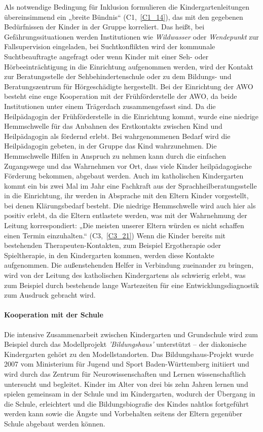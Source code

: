 Als notwendige Bedingung für Inklusion formulieren die Kindergartenleitungen übereinsimmend ein „breite Bündnis“ (C1,~\ref{C1_14}), das mit den gegebenen Bedürfnissen der Kinder in der Gruppe korreliert. Das heißt, bei Gefährungssituationen werden Institutionen wie \emph{Wildwasser} oder \emph{Wendepunkt} zur Fallsupervision eingeladen, bei Suchtkonflikten wird der kommunale Suchtbeauftragte angefragt oder wenn Kinder mit einer Seh- oder Hörbeeinträchtigung in die Einrichtung aufgenommen werden, wird der Kontakt zur Beratungsstelle der Sehbehindertenschule oder zu dem Bildungs- und Beratungszentrum für Hörgeschädigte hergestellt. Bei der Einrichtung der AWO besteht eine enge Kooperation mit der Frühförderstelle der AWO, da beide Institutionen unter einem Trägerdach zusammengefasst sind. Da die Heilpädagogin der Frühförderstelle in die Einrichtung kommt, wurde eine niedrige Hemmschwelle für das Anbahnen des Erstkontakts zwischen Kind und Heilpädagogin als fördernd erlebt. Bei wahrgenommenen Bedarf wird die Heilpädagogin gebeten, in der Gruppe das Kind wahrzunehmen. Die Hemmschwelle Hilfen in Anspruch zu nehmen kann durch die einfachen Zugangswege und das Wahrnehmen vor Ort, dass viele Kinder heilpädagogische Förderung bekommen, abgebaut werden.
Auch im katholischen Kindergarten kommt ein bis zwei Mal im Jahr eine Fachkraft aus der Sprachheilberatungsstelle in die Einrichtung, ihr werden in Absprache mit den Eltern Kinder vorgestellt, bei denen Klärungsbedarf besteht. Die niedrige Hemmschwelle wird auch hier als positiv erlebt, da die Eltern entlastete werden, was mit der Wahrnehmung der Leitung korrespondiert: „Die meisten unserer Eltern würden es nicht schaffen einen Termin einzuhalten.“ (C3,~\ref{C3_21}) 
Wenn die Kinder bereits mit bestehenden Therapeuten-Kontakten, zum Beispiel Ergotherapie oder Spieltherapie, in den Kindergarten kommen, werden diese Kontakte aufgenommen.     
Die außenstehenden Helfer in Verbindung zueinander zu bringen, wird von der Leitung des katholischen Kindergartens als schwierig erlebt, was zum Beispiel durch bestehende lange Wartezeiten für eine Entwicklungsdiagnostik zum Ausdruck gebracht wird. 
  
\paragraph{Kooperation mit der Schule}
Die intensive Zusammenarbeit zwischen Kindergarten und Grundschule wird zum Beispiel durch das Modellprojekt \emph{'Bildungshaus'} unterstützt -- der diakonische Kindergarten gehört zu den Modellstandorten. Das Bildungshaus-Projekt wurde 2007 vom Ministerium für Jugend und Sport Baden-Württemberg initiiert und wird durch das Zentrum für Neurowissenschaften und Lernen wissenschaftlich untersucht und begleitet. 
Kinder im Alter von drei bis zehn Jahren lernen und spielen gemeinsam in der Schule und im Kindergarten, wodurch der Übergang in die Schule, erleichtert und die Bildungsbiografie des Kindes nahtlos fortgeführt werden kann sowie die Ängste und Vorbehalten seitens der Eltern gegenüber Schule abgebaut werden können.

